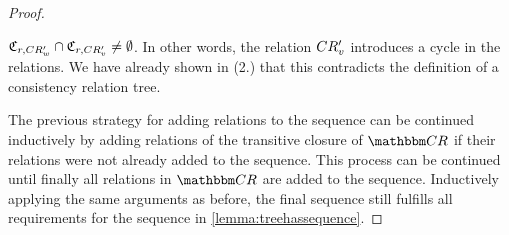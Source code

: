 \begin{proof}
\begin{enumerate}
    $\mathfrak{C}_{r,CR'_{w}} \cap \mathfrak{C}_{r,CR'_{v}} \neq \emptyset$.
    In other words, the relation $CR'_{v}$ introduces a cycle in the relations.
    We have already shown in (2.) that this contradicts the definition of a consistency relation tree.
    \end{enumerate}
    The previous strategy for adding relations to the sequence can be continued inductively by adding relations of the transitive closure of $\consistencyrelationset{CR}$ if their relations were not already added to the sequence.
    This process can be continued until finally all relations in $\consistencyrelationset{CR}$ are added to the sequence.
    Inductively applying the same arguments as before, the final sequence still fulfills all requirements for the sequence in \autoref{lemma:treehassequence}.

\end{proof}
